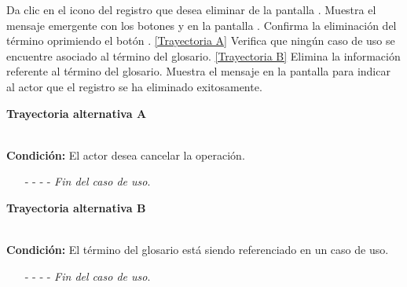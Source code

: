 	\begin{UCtrayectoria}
		\UCpaso[\UCactor] Da clic en el icono \eliminar del registro que desea eliminar de la pantalla .
		\UCpaso[\UCsist] Muestra el mensaje emergente  con los botones  y  en la pantalla .
		\UCpaso[\UCactor] Confirma la eliminación del término oprimiendo el botón . \hyperlink{CU6-3:TAA}{[Trayectoria A]}
		\UCpaso[\UCsist] Verifica que ningún caso de uso se encuentre asociado al término del glosario. \hyperlink{CU6-3:TAB}{[Trayectoria B]}
		\UCpaso[\UCsist] Elimina la información referente al término del glosario.
		\UCpaso[\UCsist] Muestra el mensaje  en la pantalla  para indicar al actor que el registro se ha eliminado exitosamente.
	\end{UCtrayectoria}		


\hypertarget{CU6-3:TAA}{\textbf{Trayectoria alternativa A}}\\
\noindent \textbf{Condición:} El actor desea cancelar la operación.
\begin{enumerate}
	\UCpaso[\UCactor] Oprime el botón  de la pantalla emergente.
	\UCpaso[\UCsist] Muestra la pantalla .
	\item[- -] - - {\em {Fin del caso de uso}}.%
\end{enumerate}	
\hypertarget{CU6-3:TAB}{\textbf{Trayectoria alternativa B}}\\
\noindent \textbf{Condición:} El término del glosario está siendo referenciado en un caso de uso.
\begin{enumerate}
	\UCpaso[\UCsist] Muestra el mensaje  en la pantalla .
	\item[- -] - - {\em {Fin del caso de uso}}.
\end{enumerate}


